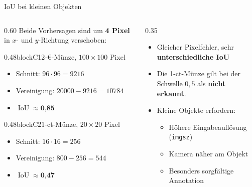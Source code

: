 \begin{frame}{IoU bei kleinen Objekten}
\footnotesize
{}
\begin{columns}
\begin{column}{0.60\textwidth}
Beide Vorhersagen sind um \textbf{4 Pixel} in $x$- und $y$-Richtung verschoben:

\vspace{0.5em}
\begin{blockrow}
  \begin{blockcol}{0.48\linewidth}{blockC1}{2-€-Münze, $100 \times 100$ Pixel}
    \begin{itemize}
      \item Schnitt: $96 \cdot 96 = \num{9216}$
      \item Vereinigung: $\num{20000} - \num{9216} = \num{10784}$
      \item $\operatorname{IoU} \approx \textbf{0{,}85}$
    \end{itemize}
  \end{blockcol}
  \begin{blockcol}{0.48\linewidth}{blockC2}{1-ct-Münze, $20 \times 20$ Pixel}
    \begin{itemize}
      \item Schnitt: $16 \cdot 16 = 256$
      \item Vereinigung: $800 - 256 = 544$
      \item $\operatorname{IoU} \approx \textbf{0{,}47}$
    \end{itemize}
  \end{blockcol}
\end{blockrow}
\end{column}
\begin{column}{0.35\textwidth}
\begin{itemize}
  \item Gleicher Pixelfehler, sehr \textbf{unterschiedliche IoU}
  \item Die 1-ct-Münze gilt bei der Schwelle $0{,}5$ als \textbf{nicht erkannt}.
  \item Kleine Objekte erfordern:
  \footnotesize
  \begin{itemize}
    \item Höhere Eingabeauflösung (\texttt{imgsz})
    \item Kamera näher am Objekt
    \item Besonders sorgfältige Annotation
  \end{itemize}
\end{itemize}
\end{column}
\end{columns}
\end{frame}

